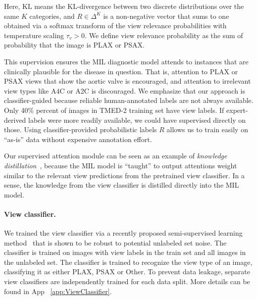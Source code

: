 Here, $\text{KL}$ means the KL-divergence between two discrete distributions over the same $K$ categories, and $R \in \Delta^K$ is a non-negative vector that sums to one obtained via a softmax transform of the view relevance probabilities with temperature scaling $\tau_{v} > 0$. We define view relevance probability as the sum of probability that the image is PLAX or PSAX. 


This supervision ensures the MIL diagnostic model attends to instances that are clinically plausible for the disease in question. That is, attention to PLAX or PSAX views that show the aortic valve is encouraged, and attention to irrelevant view types like A4C or A2C is discouraged. 
We emphasize that our approach is classifier-guided because reliable human-annotated labels are not always available. Only 40\% percent of images in TMED-2 training set have view labels. If expert-derived labels were more readily available, we could have supervised directly on those. Using classifier-provided probabilistic labels $R$ allows us to train easily on ``as-is'' data without expensive annotation effort.

Our supervised attention module can be seen as an example of \emph{knowledge distillation}~\citep{hinton2015distilling}, because the MIL model is ``taught'' to output attentions weight similar to the relevant view predictions from the pretrained view classifier. In a sense, the knowledge from the view classifier is distilled directly into the MIL model. 



\paragraph{View classifier.}
We trained the view classifier via a recently proposed semi-supervised learning method~\citep{huang2022fix} that is shown to be robust to potential unlabeled set noise. The classifier is trained on images with view labels in the train set and all images in the unlabeled set. The classifier is trained to recognize the view type of an image, classifying it as either PLAX, PSAX or Other. To prevent data leakage, separate view classifiers are independently trained for each data split. More details can be found in App ~\ref{app:ViewClassifier}. 

